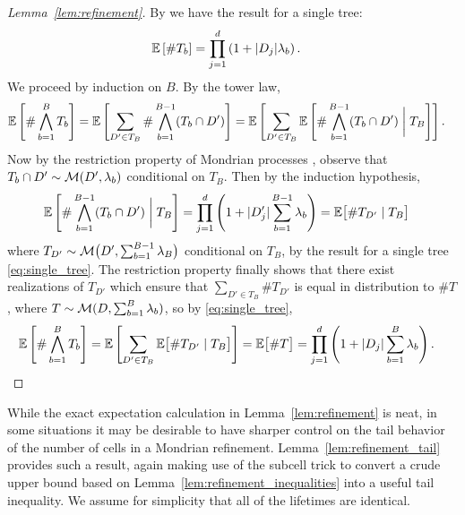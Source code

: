 \begin{proof}[Lemma~\ref{lem:refinement}]

  By \citet[Proposition~2]{mourtada2020minimax}
  we have the result for a single tree:
  \begin{align}
    \label{eq:single_tree}
    \mathbb{E}\left[\# T_b \right]
    &= \prod_{j=1}^d \left(
      1 + |D_j| \lambda_b
    \right).
  \end{align}
  We proceed by induction on $B$.
  By the tower law,
  \begin{align*}
    \mathbb{E}\left[\# \bigwedge_{b=1}^B T_b \right]
    &=
    \mathbb{E}\left[
      \sum_{D' \in T_B}
      \#
      \bigwedge_{b=1}^{B-1} (T_b \cap D')
    \right]
    = \mathbb{E}\left[
      \sum_{D' \in T_B}
      \mathbb{E}\left[
        \#
        \bigwedge_{b=1}^{B-1} (T_b \cap D')
        \biggm| T_B
      \right]
    \right].
  \end{align*}
  Now by the restriction property of Mondrian processes
  \citep[Fact~2]{mourtada2020minimax},
  observe that $T_b \cap D' \sim \mathcal{M}(D', \lambda_b)$
  conditional on $T_B$.
  Then by the induction hypothesis,
  \begin{align*}
    \mathbb{E}\left[
      \#
      \bigwedge_{b=1}^{B-1} (T_b \cap D')
      \biggm| T_B
    \right]
    &=
    \prod_{j=1}^d \left(
      1 + |D'_j| \sum_{b=1}^{B-1} \lambda_b
    \right)
    = \mathbb{E}\big[
      \# T_{D'} \mid T_B
    \big]
  \end{align*}
  where $T_{D'} \sim \mathcal{M}\big(D', \sum_{b=1}^{B-1} \lambda_B\big)$
  conditional on $T_B$,
  by the result for a single tree \eqref{eq:single_tree}.
  The restriction property finally shows that there exist realizations
  of $T_{D'}$ which ensure that
  $\sum_{D' \in T_B} \# T_{D'}$ is equal in distribution
  to $\# T$, where $T \sim \mathcal{M}(D, \sum_{b=1}^B \lambda_b)$,
  so by \eqref{eq:single_tree},
  \begin{align*}
    \mathbb{E}\left[\# \bigwedge_{b=1}^B T_b \right]
    &=
    \mathbb{E}\left[
      \sum_{D' \in T_B}
      \mathbb{E}\big[
        \# T_{D'} \mid T_B
      \big]
    \right]
    =
    \mathbb{E}\big[\# T \big]
    = \prod_{j=1}^d \left(
      1 + |D_j| \sum_{b=1}^B \lambda_b
    \right).
  \end{align*}
\end{proof}

While the exact expectation calculation in Lemma~\ref{lem:refinement} is neat,
in some situations it may be desirable to have sharper control on the tail
behavior of the number of cells in a Mondrian refinement.
Lemma~\ref{lem:refinement_tail} provides such a result, again making
use of the subcell trick to convert a crude upper bound based on
Lemma~\ref{lem:refinement_inequalities} into a useful tail inequality.
We assume for simplicity that all of the lifetimes are identical.

